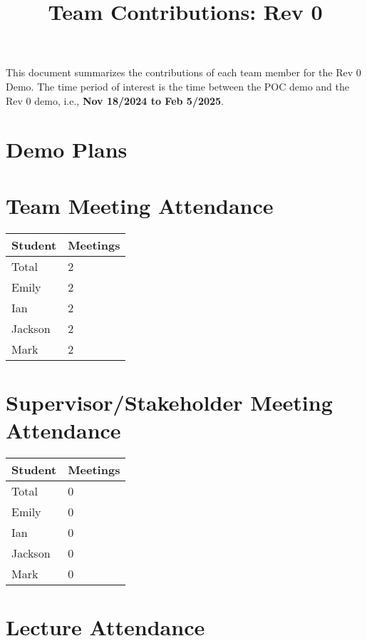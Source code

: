 \documentclass{article}
\title{Team Contributions: Rev 0\\\progname}
\author{\authname}
\date{}
\begin{document}
\maketitle

This document summarizes the contributions of each team member for the Rev 0
Demo.  The time period of interest is the time between the POC demo and the Rev
0 demo, i.e., \textbf{Nov 18/2024 to Feb 5/2025}.

\section{Demo Plans}


\section{Team Meeting Attendance}

\begin{table}[H]
\centering
\begin{tabular}{ll}
\toprule
\textbf{Student} & \textbf{Meetings}\\
\midrule
Total & 2\\
Emily & 2\\
Ian & 2\\
Jackson & 2\\
Mark & 2\\
\bottomrule
\end{tabular}
\end{table}

\section{Supervisor/Stakeholder Meeting Attendance}

\begin{table}[H]
\centering
\begin{tabular}{ll}
\toprule
\textbf{Student} & \textbf{Meetings}\\
\midrule
Total & 0\\
Emily & 0\\
Ian & 0\\
Jackson & 0\\
Mark & 0\\
\bottomrule
\end{tabular}
\end{table}

\section{Lecture Attendance}
\end{document}
